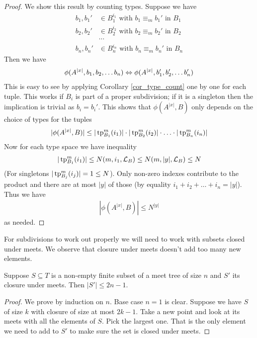 \documentclass{amsart}
\begin{document}
\begin{proof}
	We show this result by counting types. Suppose we have
	\begin{align*}
		b_1, b_1' &\in B_1^{i_1} \text{ with } b_1 \equiv_m b_1' \text { in } B_1 \\
		b_2, b_2' &\in B_2^{i_2} \text{ with } b_2 \equiv_m b_2' \text { in } B_2 \\
		&\cdots \\
		b_n, b_n' &\in B_n^{i_n} \text{ with } b_n \equiv_m b_n' \text { in } B_n
	\end{align*}
	Then we have
	\begin{align*}
		\phi(A^{|x|}, b_1, b_2, \ldots b_n) \Leftrightarrow \phi(A^{|x|}, b_1', b_2', \ldots b_n')
	\end{align*}
	This is easy to see by applying Corollary \ref{cor_type_count} one by one for each tuple. This works if $B_i$ is part of a proper subdivision; if it is a singleton then the implication is trivial as $b_i = b_i'$.
	This shows that $\phi(A^{|x|}, B)$ only depends on the choice of types for the tuples
	\begin{align*}
		|\phi(A^{|x|}, B)| \leq |\operatorname{tp}^m_{B_1}(i_1)| \cdot |\operatorname{tp}^m_{B_2}(i_2)| \cdot \ldots \cdot |\operatorname{tp}^m_{B_n}(i_n)|
	\end{align*}
	Now for each type space we have inequality
	\begin{align*}
		|\operatorname{tp}^m_{B_1}(i_1)| \leq N(m, i_1, \mathcal L_B) \leq N(m, |y|, \mathcal L_B) \leq N
	\end{align*}
	(For singletons $|\operatorname{tp}^m_{B_j}(i_j)| = 1 \leq N$). Only non-zero indexes contribute to the product and there are at most $|y|$ of those (by equality $i_1 + i_2 + \ldots + i_n = |y|$). Thus we have
	\begin{align*}
		|\phi(A^{|x|}, B)| \leq N^{|y|}
	\end{align*}
	as needed.
\end{proof}

For subdivisions to work out properly we will need to work with subsets closed under meets. We observe that closure under meets doesn't add too many new elements.

\begin{Lemma} \label{lm_meet}
	Suppose $S \subseteq T$ is a non-empty finite subset of a meet tree of size $n$ and $S'$ its closure under meets. Then $|S'| \leq 2n - 1$.
\end{Lemma}
\begin{proof}
	We prove by induction on $n$. Base case $n = 1$ is clear. Suppose we have $S$ of size $k$ with closure of size at most $2k - 1$. Take a new point and look at its meets with all the elements of $S$. Pick the largest one. That is the only element we need to add to $S'$ to make sure the set is closed under meets.
\end{proof}
\end{document}
